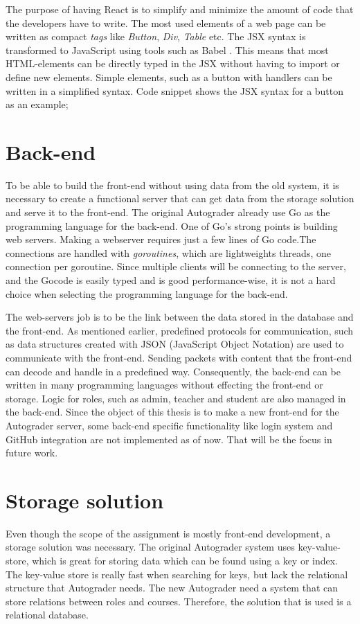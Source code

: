 The purpose of having React is to simplify and minimize the amount of code that the developers have to write. The most used elements of a web page can be written as compact \emph{tags} like \emph{Button}, \emph{Div}, \emph{Table} etc. The JSX syntax is transformed to JavaScript using tools such as Babel . This means that most HTML-elements can be directly typed in the JSX without having to import or define new elements. Simple elements, such as a button with handlers can be written in a simplified syntax. Code snippet  shows the JSX syntax for a button as an example;


\section{Back-end}
To be able to build the front-end without using data from the old system, it is necessary to create a functional server that can get data from the storage solution and serve it to the front-end. The original Autograder already use Go as the programming language for the back-end. One of Go's strong points is building web servers. Making a webserver requires just a few lines of Go code.The connections are handled with \emph{goroutines}, which are lightweights threads, one connection per goroutine. Since multiple clients will be connecting to the server, and the Gocode is easily typed and is good performance-wise, it is not a hard choice when selecting the programming language for the back-end. 

The web-servers job is to be the link between the data stored in the database and the front-end. As mentioned earlier, predefined protocols for communication, such as data structures created with JSON (JavaScript Object Notation) are used to communicate with the front-end. Sending packets with content that the front-end can decode and handle in a predefined way. Consequently, the back-end can be written in many programming languages without effecting the front-end or storage. Logic for roles, such as admin, teacher and student are also managed in the back-end. Since the object of this thesis is to make a new front-end for the Autograder server, some back-end specific functionality like login system and GitHub integration are not implemented as of now. That will be the focus in future work.

\section{Storage solution}
Even though the scope of the assignment is mostly front-end development, a storage solution was necessary. The original Autograder system uses key-value-store, which is great for storing data which can be found using a key or index. The key-value store is really fast when searching for keys, but lack the relational structure that Autograder needs. The new Autograder need a system that can store relations between roles and courses. Therefore, the solution that is used is a relational database. 

